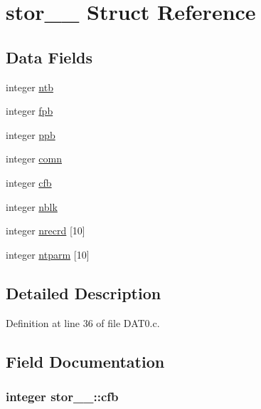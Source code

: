 \hypertarget{structstor__1__}{}\section{stor\+\_\+\_\+ Struct Reference}
\label{structstor__1__}
\subsection*{Data Fields}
\begin{DoxyCompactItemize}
\item 
integer \hyperlink{structstor__1___a2128265ba5866af2771204f9b4c914de}{ntb}
\item 
integer \hyperlink{structstor__1___a6b22b87a6c1f19af004e05cc19861395}{fpb}
\item 
integer \hyperlink{structstor__1___af0eb7e8d14d6c2e60ccecc144080d09a}{ppb}
\item 
integer \hyperlink{structstor__1___ad80d9f5b7a02f35d33c48a0e38c5587b}{comn}
\item 
integer \hyperlink{structstor__1___ad0c65d911c06c0cd78e9f5fc37af0141}{cfb}
\item 
integer \hyperlink{structstor__1___a44f6d4a08f606df0cb5c82e523e2d507}{nblk}
\item 
integer \hyperlink{structstor__1___ace036822b0cf9e703a8be166f6242d8f}{nrecrd} \mbox{[}10\mbox{]}
\item 
integer \hyperlink{structstor__1___a71312f529db491234e65d8d51ef6ca35}{ntparm} \mbox{[}10\mbox{]}
\end{DoxyCompactItemize}


\subsection{Detailed Description}


Definition at line 36 of file D\+A\+T0.\+c.



\subsection{Field Documentation}
\subsubsection[{\texorpdfstring{cfb}{cfb}}]{\setlength{\rightskip}{0pt plus 5cm}integer stor\+\_\+\_\+\+::cfb}\hypertarget{structstor__1___ad0c65d911c06c0cd78e9f5fc37af0141}{}\label{structstor__1___ad0c65d911c06c0cd78e9f5fc37af0141}


